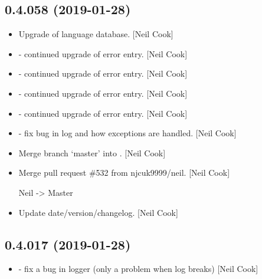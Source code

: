 \documentclass[a4paper,10pt,english]{report}
\begin{document}
\subsection{0.4.058 (2019-01-28)}
\label{\detokenize{misc/changelog:id205}}\begin{itemize}
\item {} 
Upgrade of language database. {[}Neil Cook{]}

\item {} 
 - continued upgrade of error entry. {[}Neil Cook{]}

\item {} 
 - continued upgrade of error entry. {[}Neil Cook{]}

\item {} 
 - continued upgrade of error entry. {[}Neil Cook{]}

\item {} 
 - continued upgrade of error entry. {[}Neil Cook{]}

\item {} 
 - fix bug in log and how exceptions are handled. {[}Neil
Cook{]}

\item {} 
Merge branch ‘master’ into . {[}Neil Cook{]}

\item {} 
Merge pull request \#532 from njcuk9999/neil. {[}Neil Cook{]}

Neil -\textgreater{} Master

\item {} 
Update date/version/changelog. {[}Neil Cook{]}

\end{itemize}


\subsection{0.4.017 (2019-01-28)}
\label{\detokenize{misc/changelog:id206}}\begin{itemize}
\item {} 
 - fix a bug in logger (only a problem when log breaks)
{[}Neil Cook{]}

\end{itemize}
\end{document}
